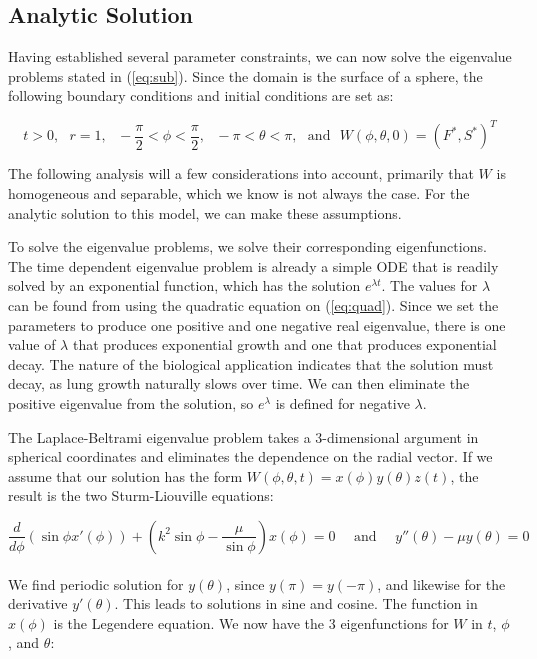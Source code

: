 \documentclass[12pt]{article}
\begin{document}
\subsection{Analytic Solution}\label{analytic}

Having established several parameter constraints, we can now solve the eigenvalue problems stated in (\ref{eq:sub}). Since the domain is the surface of a sphere, the following boundary conditions and initial conditions are set as:

$$ t>0, ~~~ r=1, ~~~ -\frac{\pi}{2}<\phi<\frac{\pi}{2}, ~~~ -\pi<\theta<\pi, ~~~ \text{and} ~~~ W(\phi,\theta,0) = (F^*,S^*)^T $$

\noindent The following analysis will a few considerations into account, primarily that $W$ is homogeneous and separable, which we know is not always the case. For the analytic solution to this model, we can make these assumptions. 

To solve the eigenvalue problems, we solve their corresponding eigenfunctions. The time dependent eigenvalue problem is already a simple ODE that is readily solved by an exponential function, which has the solution $e^{\lambda t}$. The values for $\lambda$ can be found from using the quadratic equation on (\ref{eq:quad}). Since we set the parameters to produce one positive and one negative real eigenvalue, there is one value of $\lambda$ that produces exponential growth and one that produces exponential decay. The nature of the biological application indicates that the solution must decay, as lung growth naturally slows over time. We can then eliminate the positive eigenvalue from the solution, so $e^{\lambda}$ is defined for negative $\lambda$.

The Laplace-Beltrami eigenvalue problem takes a 3-dimensional argument in spherical coordinates and eliminates the dependence on the radial vector. If we assume that our solution has the form $ W(\phi,\theta,t)=x(\phi)y(\theta)z(t) $, the result is the two Sturm-Liouville equations:

\begin{equation*}
    \frac{d}{d\phi}\left(\sin{\phi}x'(\phi)\right)+\left(k^2\sin{\phi}-\frac{\mu}{\sin{\phi}}\right)x(\phi)=0 
    ~~~~~~ \text{and} ~~~~~~
    y''(\theta) - \mu y(\theta) = 0
\end{equation*}
\\
\noindent We find periodic solution for $y(\theta)$, since $y(\pi)=y(-\pi)$, and likewise for the derivative $y'(\theta)$. This leads to solutions in sine and cosine. The function in $x(\phi)$ is the Legendere equation. We now have the 3 eigenfunctions for $W$ in $t$, $\phi$, and $\theta$:
\end{document}
